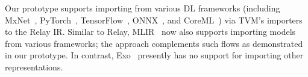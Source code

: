 Our \TLA prototype supports importing from various DL frameworks (including MxNet~\cite{chen2015mxnet}, PyTorch~\cite{paszke2019pytorch}, TensorFlow~\cite{abadi2016tensorflow}, ONNX~\cite{linux2019onnx}, and CoreML~\cite{apple2022coreml}) via TVM's importers to the Relay IR.
Similar to Relay, MLIR~\cite{lattner2021mlir} now also  supports importing models from 
various frameworks; the \TLA approach complements such flows as demonstrated in our prototype.
In contrast, Exo~\cite{ExoPldi22} presently has no support for importing other representations.


